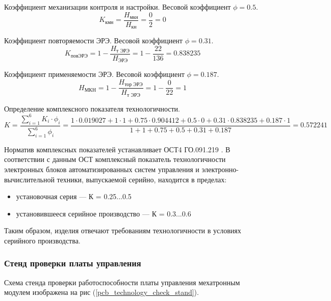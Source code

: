Коэффициент механизации контроля и настройки.
Весовой коэффициент $\phi = 0.5$.
$$
K_\text{кмн}
    = \frac{H_\text{мкн}}
           {H_\text{кн}}
    = \frac{0}{2}
    = 0
$$

Коэффициент повторяемости ЭРЭ.
Весовой коэффициент $\phi = 0.31$.
$$
K_\text{повЭРЭ}
    = 1 - \frac{H_\text{т ЭРЭ}}
               {H_\text{ЭРЭ}}
    = 1 - \frac{22}{136}
    = 0.838235
$$

Коэффициент применяемости ЭРЭ.
Весовой коэффициент $\phi = 0.187$.
$$
H_{\text{МКН}}
    = 1 - \frac{H_\text{тор ЭРЭ}}
               {H_\text{т ЭРЭ}}
    = 1 - \frac{0}{22}
    = 1
$$

Определение комплексного показателя технологичности.
$$
K   = \frac{\sum_{i=1}^6 K_i \cdot \phi_i }
         {\sum_{i=1}^6 \phi_i }
    = \frac{ 1 \cdot 0.019027
             + 1 \cdot 1
             + 0.75 \cdot 0.904412
             + 0.5 \cdot 0
             + 0.31 \cdot 0.838235
             + 0.187 \cdot 1 }
           { 1
             + 1
             + 0.75
             + 0.5
             + 0.31
             + 0.187 }
    = 0.572241
$$

Норматив комплексных показателей устанавливает
ОСТ4 ГО.091.219 \cite{OST4_GO_010_011}.
В соответствии с данным ОСТ комплексный показатель технологичности электронных
блоков автоматизированных систем управления и электронно-вычислительной техники,
выпускаемой серийно, находится в пределах:

\begin{itemize}
    \item установочная серия --- К = 0.25...0.5
    \item установившееся серийное производство --- К = 0.3...0.6
\end{itemize}

Таким образом, изделия отвечают требованиям технологичности в условиях
серийного производства.

\subsubsection{Стенд проверки платы управления}
Схема стенда проверки работоспособности платы управления мехатронным модулем
изображена на рис (\ref{pcb_technology_check_stand}).

